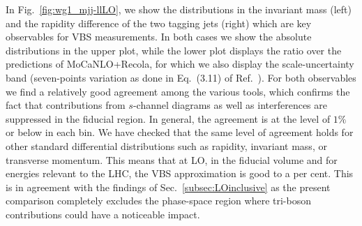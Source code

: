 In Fig.~\ref{fig:wg1_mjj-llLO}, we show the distributions in the invariant mass (left) and the rapidity difference of the two tagging jets (right) which are key observables for VBS measurements.
In both cases we show the absolute distributions in the upper plot, while the lower plot displays the ratio over the predictions of {\sc MoCaNLO+Recola}, 
for which we also display the scale-uncertainty band (seven-points variation as done in Eq.~(3.11) of Ref.~\cite{Biedermann:2017bss}).
For both observables we find a relatively good agreement among the various tools, which confirms the fact that contributions from $s$-channel diagrams as well as interferences are suppressed in the fiducial region.
In general, the agreement is at the level of $1\%$ or below in each bin.
We have checked that the same level of agreement holds for other standard differential distributions such as rapidity, invariant mass, or transverse momentum.
This means that at LO, in the fiducial volume and for energies relevant to the LHC, the VBS approximation is good to a per cent.
This is in agreement with the findings of Sec.~\ref{subsec:LOinclusive} as the present comparison completely excludes the phase-space region where tri-boson contributions could have a noticeable impact.

